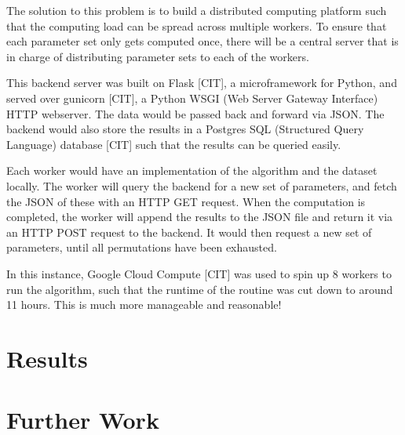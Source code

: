         The solution to this problem is to build a distributed computing platform such that the computing load can be spread across multiple workers. To ensure that each parameter set only gets computed once, there will be a central server that is in charge of distributing parameter sets to each of the workers. 

        This backend server was built on Flask [CIT], a microframework for Python, and served over gunicorn [CIT], a Python WSGI (Web Server Gateway Interface) HTTP webserver. The data would be passed back and forward via JSON. The backend would also store the results in a Postgres SQL (Structured Query Language) database [CIT] such that the results can be queried easily.

        Each worker would have an implementation of the algorithm and the dataset locally. The worker will query the backend for a new set of parameters, and fetch the JSON of these with an HTTP GET request. When the computation is completed, the worker will append the results to the JSON file and return it via an HTTP POST request to the backend. It would then request a new set of parameters, until all permutations have been exhausted.

        In this instance, Google Cloud Compute [CIT] was used to spin up 8 workers to run the algorithm, such that the runtime of the routine was cut down to around 11 hours. This is much more manageable and reasonable!

    \chapter{Results}

    \chapter{Further Work}